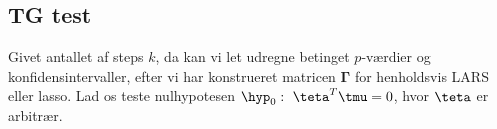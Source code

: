 
\subsection{TG test}
Givet antallet af steps \(k\), da kan vi let udregne betinget \(p\)-værdier og konfidensintervaller, efter vi har konstrueret matricen \(\boldsymbol{\Gamma}\) for henholdsvis LARS eller lasso.
Lad os teste nulhypotesen \(\hyp_0: \ \teta^T \tmu = 0\), hvor \(\teta\) er arbitrær.

